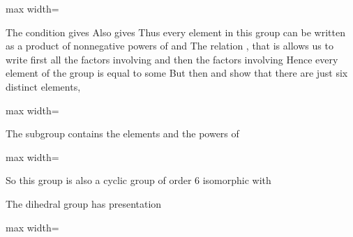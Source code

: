 \documentclass[11pt,oneside]{article}
\begin{document}
\begin{BookBody}
\begin{center}\begin{adjustbox}{max width=\linewidth}\end{adjustbox}\end{center}

\noindent The condition  gives  Also  gives  Thus every element in this group can be written as a product of nonnegative powers of  and  The relation  , that is allows us to write first all the factors involving  and then the factors involving  Hence every element of the group is equal to some  But then  and  show that there are just six distinct elements,

\begin{center}\begin{adjustbox}{max width=\linewidth}\end{adjustbox}\end{center}

\noindent The subgroup  contains the elements  and the powers of 

\begin{center}\begin{adjustbox}{max width=\linewidth}\end{adjustbox}\end{center}

\noindent So this group is also a cyclic group of order 6 isomorphic with  \BookEnd{\blacktriangle}

 The dihedral group has presentation

\begin{center}\begin{adjustbox}{max width=\linewidth}\end{adjustbox}\end{center}


\end{BookBody}
\end{document}
